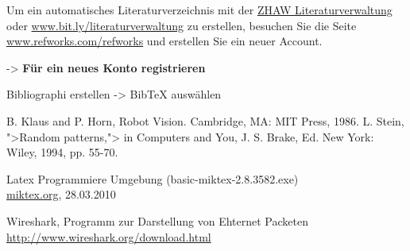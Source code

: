 %
%

Um ein automatisches Literaturverzeichnis mit der 
\href{http://www.zhaw.ch/de/zhaw/hochschulbibliothek/dienstleistungen/literaturverwaltung.html}{ZHAW Literaturverwaltung} oder \href{www.bit.ly/literaturverwaltung}{www.bit.ly/literaturverwaltung} zu erstellen, besuchen Sie die Seite \href{www.refworks.com/refworks}{www.refworks.com/refworks} und erstellen Sie ein neuer Account.

-> \textbf{Für ein neues Konto registrieren}

Bibliographi erstellen -> BibTeX auswählen




\begin{thebibliography}{99}
\label{cha:literaturverzeichnis}








 B. Klaus and P. Horn, Robot Vision. Cambridge, MA: MIT Press, 1986.
 L. Stein, ">Random patterns,"> in Computers and You, J. S. Brake, Ed. New York: Wiley, 1994, pp. 55-70.










 Latex Programmiere Umgebung (basic-miktex-2.8.3582.exe)\\
\href{http://www.miktex.org/about}{miktex.org}, 28.03.2010

Wireshark, Programm zur Darstellung von Ehternet Packeten\\
\href{http://www.wireshark.org/download.html}{http://www.wireshark.org/download.html}



\end{thebibliography}
